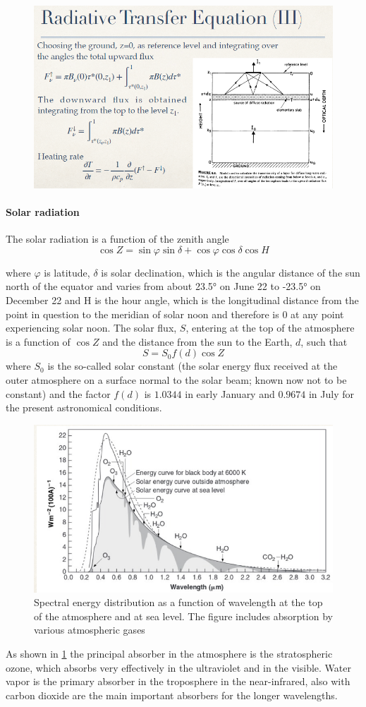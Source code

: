 \begin{figure}[htpb]
    \centering
    \includegraphics[width=0.5\linewidth]{uploads/18image.png}
  \end{figure}

\paragraph{Solar radiation} The solar radiation is a function of the zenith angle 
$$\cos Z = \sin \varphi \sin \delta + \cos \varphi \cos \delta \cos H$$

where $\varphi$ is latitude, $\delta$ is solar declination, which is the angular distance of the sun north of the equator and varies from about 23.5° on June 22 to -23.5° on December 22 and H is the hour angle, which is the longitudinal distance from the point in question to the meridian of solar noon and therefore is 0 at any point experiencing solar noon.
The solar flux, $S$, entering at the top of the atmosphere is a function of $\cos Z$ and the distance from the sun to the Earth, $d$, such that 
$$S = S_0 f(d) \cos Z$$
where $S_{0}$ is the so-called solar constant (the solar energy flux received at the outer atmosphere on a surface normal to the solar beam; known now not to be constant) and the factor $f(d)$ is $1.0344$ in early January and $0.9674$ in July for the present astronomical conditions. 
\begin{figure}[htp!]
    \centering
    \includegraphics[width=0.5\linewidth]{uploads/image12.png}
    \caption{Spectral energy distribution as a function of wavelength at the top of the atmosphere and at sea level. The figure includes absorption by various atmospheric gases}
    \label{fig1}
    
\end{figure}
As shown in \ref{fig1} the principal absorber in the atmosphere is the stratospheric ozone, which absorbs very effectively in the ultraviolet and in the visible. Water vapor is the primary absorber in the troposphere in the near-infrared, also with carbon dioxide are the main important absorbers for the longer wavelengths. 

